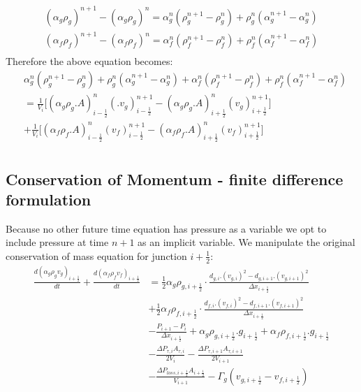 \documentclass[11pt,letterpaper,titlepage]{article}
\newcommand{\half}{\frac{1}{2}}
\begin{document}
\begin{equation*}
\begin{aligned}
(\alpha_g \rho_g)^{n+1}-(\alpha_g \rho_g)^{n} = \alpha_g^n (\rho_g^{n+1}-\rho_g^n)+\rho_g^n(\alpha_g^{n+1}-\alpha_g^n)\\
(\alpha_f \rho_f)^{n+1}-(\alpha_f \rho_f)^{n} = \alpha_f^n (\rho_f^{n+1}-\rho_f^n)+\rho_f^n(\alpha_f^{n+1}-\alpha_f^n)\\
\end{aligned}
\end{equation*}
\newline
\noindent Therefore the above equation becomes:
\begin{equation} \label{eq:mixmass}
\begin{aligned}
&\alpha_g^n (\rho_g^{n+1}-\rho_g^n)+\rho_g^n(\alpha_g^{n+1}-\alpha_g^n)
+\alpha_f^n (\rho_f^{n+1}-\rho_f^n)+\rho_f^n(\alpha_f^{n+1}-\alpha_f^n)\\
&= \frac{1}{V_i}\biggr[(\alpha_g\rho_g.A)_{i-\half}^{n} (.v_g)_{i-\half}^{n+1}
-(\alpha_g\rho_g.A)_{i+\half}^{n} (v_g)_{i+\half}^{n+1} \biggr]\\
&+ \frac{1}{V_i}\biggr[(\alpha_f\rho_f.A)_{i-\half}^{n} (v_f)_{i-\half}^{n+1}
-(\alpha_f\rho_f.A)_{i+\half}^{n} (v_f)_{i+\half}^{n+1} \biggr]\\
\end{aligned}
\end{equation}


\vspace{1cm}
\subsection{Conservation of Momentum - finite difference formulation}
Because no other future time equation has pressure as a variable we opt to include pressure at time $n+1$ as an implicit variable. We manipulate the original conservation of mass equation for junction $i+\half$:
\begin{equation*}
\begin{aligned}
\frac{d(\alpha_g\rho_g v_g)_{i+\half}}{dt}+\frac{d(\alpha_f\rho_f v_f)_{i+\half}}{dt}
&=\half \alpha_g \rho_{g,i+\half} \cdot\frac{d_{g,i}.(v_{g,i})^2-d_{g,i+1}.(v_{g,i+1})^2}{\Delta x_{i+\half}} \\
&+\half \alpha_f \rho_{f,i+\half} \cdot\frac{d_{f,i}.(v_{f,i})^2-d_{f,i+1}.(v_{f,i+1})^2}{\Delta x_{i+\half}} \\
&-\frac{P_{i+1}-P_i}{\Delta x_{i+\half}} + \alpha_g \rho_{g,i+\half}.g_{i+\half} + \alpha_f\rho_{f,i+\half}.g_{i+\half}\\
&-\frac{\Delta P_{\tau,i}A_{\tau,i}}{2V_i}-\frac{\Delta P_{\tau,i+1}A_{\tau,i+1}}{2V_{i+1}} \\
&-\frac{\Delta P_{loss,i+\half}A_{i+\half}}{V_{i+1}} - \Gamma_g (v_{g,i+\half} - v_{f,i+\half})
\end{aligned}
\end{equation*}
\end{document}
